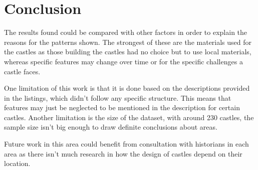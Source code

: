 \documentclass[11pt]{article}
\begin{document}
\section{Conclusion}

The results found could be compared with other factors in order to explain the reasons for the patterns shown. The strongest of these are the materials used for the castles as those building the castles had no choice but to use local materials, whereas specific features may change over time or for the specific challenges a castle faces.

One limitation of this work is that it is done based on the descriptions provided in the listings, which didn't follow any specific structure. This means that features may just be neglected to be mentioned in the description for certain castles. Another limitation is the size of the dataset, with around 230 castles, the sample size isn't big enough to draw definite conclusions about areas.

Future work in this area could benefit from consultation with historians in each area as there isn't much research in how the design of castles depend on their location.



\newpage
\printbibliography
\end{document}
